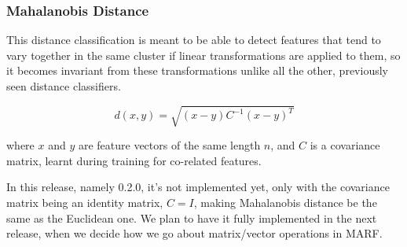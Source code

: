 \subsubsection{Mahalanobis Distance}\label{sect:mahalanobis}

This distance classification is meant to be able to detect features
that tend to vary together in the same cluster if linear
transformations are applied to them, so it becomes invariant
from these transformations unlike all the other, previously seen
distance classifiers.

$$ d(x,y) = \sqrt{(x-y) C^{-1} (x-y)^{T}} $$

\noindent
where $x$ and $y$ are feature vectors of the same length $n$, and
$C$ is a covariance matrix, learnt during training for co-related
features.

In this release, namely 0.2.0, it's not implemented yet, only with
the covariance matrix being an identity matrix, $ C = I $,
making Mahalanobis distance be the same as the Euclidean one. We plan
to have it fully implemented in the next release, when we
decide how we go about matrix/vector operations in MARF.
